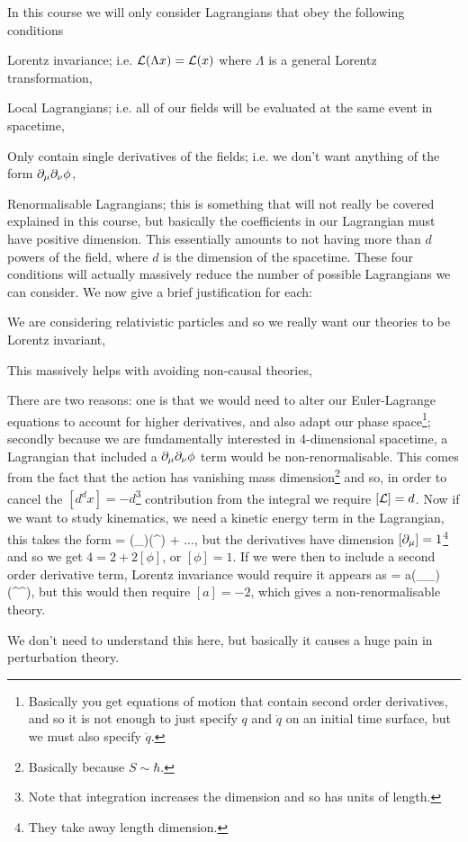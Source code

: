 In this course we will only consider Lagrangians that obey the following conditions
\ben[label=(\roman*)]
    \item Lorentz invariance; i.e. $\mathcal{L}(\Lambda x) = \mathcal{L}(x)$ where $\Lambda$ is a general Lorentz transformation,
    \item Local Lagrangians; i.e. all of our fields will be evaluated at the same event in spacetime,
    \item Only contain single derivatives of the fields; i.e. we don't want anything of the form $\partial_{\mu}\partial_{\nu}\phi$, 
    \item Renormalisable Lagrangians; this is something that will not really be covered explained in this course, but basically the coefficients in our Lagrangian must have positive dimension. This essentially amounts to not having more than $d$ powers of the field, where $d$ is the dimension of the spacetime. 
\een 
These four conditions will actually massively reduce the number of possible Lagrangians we can consider. We now give a brief justification for each: 
\ben[label=(\roman*)]
    \item We are considering relativistic particles and so we really want our theories to be Lorentz invariant, 
    \item This massively helps with avoiding non-causal theories, 
    \item There are two reasons: one is that we would need to alter our Euler-Lagrange equations to account for higher derivatives, and also adapt our phase space\footnote{Basically you get equations of motion that contain second order derivatives, and so it is not enough to just specify $q$ and $\dot{q}$ on an initial time surface, but we must also specify $\ddot{q}$.}; secondly because we are fundamentally interested in 4-dimensional spacetime, a Lagrangian that included a $\partial_{\mu}\partial_{\nu}\phi$ term would be non-renormalisable. This comes from the fact that the action has vanishing mass dimension\footnote{Basically because $S \sim \hbar$.} and so, in order to cancel the $[d^dx]=-d$\footnote{Note that integration increases the dimension and so has units of length.} contribution from the integral we require $[\mathcal{L}]=d$. Now if we want to study kinematics, we need a kinetic energy term in the Lagrangian, this takes the form
    \bse 
        \cL = (\p_{\mu}\phi)(\p^{\mu}\phi) + ...,
    \ese
    but the derivatives have dimension $[\partial_{\mu}]=1$\footnote{They take away length dimension.} and so we get $4 = 2 + 2[\phi]$, or $[\phi]=1$. If we were then to include a second order derivative term, Lorentz invariance would require it appears as
    \bse 
        \cL = a(\p_{\mu}\p_{\nu}\phi)(\p^{\mu}\p^{\nu}\phi),
    \ese 
    but this would then require $[a]=-2$, which gives a non-renormalisable theory. 
    \item We don't need to understand this here, but basically it causes a huge pain in perturbation theory. 
\een 


